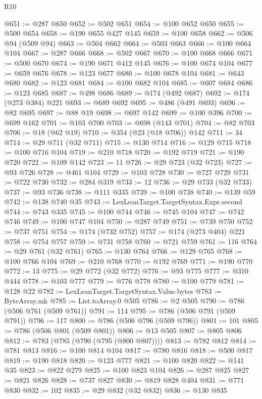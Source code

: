 \begin{lexlean}{R10}
\begin{coremodule}
@651 := @287 @650
@652 := @502 @651
@654 := @100 @652 @650
@655 := @500 @654
@658 := @190 @655 @427 @145
@659 := @100 @658
@662 := @506 @94 (@509 @94)
@663 := @504 @662
@664 := @503 @663
@666 := @100 @664 @104
@667 := @287 @666
@668 := @502 @667
@670 := @100 @668 @666
@671 := @500 @670
@674 := @190 @671 @412 @145
@676 := @100 @674 @104
@677 := @659 @676
@678 := @123 @677
@680 := @100 @678 @104
@681 := @643 @680
@682 := @123 @681
@684 := @100 @682 @104
@685 := @607 @684
@686 := @123 @685
@687 := @498 @686
@689 := @174 (@492 @687)
@692 := @174 (@273 @384) @221
@693 := @689 @692
@695 := @486 (@491 @693)
@696 := @82 @695
@697 := @88 @19
@698 := @697 @142
@699 := @100 @396
@700 := @699 @162
@701 := @103 @700
@703 := @698 (@143 @701)
@704 := @82 @703
@706 := @18 (@62 @19)
@710 := @354 (@23 (@18 @706)) @142
@711 := 34
@714 := @29 @711 (@32 @711)
@715 := @130 @714
@716 := @129 @715
@718 := @100 @716 @104
@719 := @210 @718
@720 := @192 @719
@721 := @190 @720
@722 := @109 @142
@723 := 11
@726 := @29 @723 (@32 @723)
@727 := @93 @726
@728 := @461 @104
@729 := @103 @728
@730 := @727 @729
@731 := @722 @730
@732 := @284 @319
@733 := 12
@736 := @29 @733 (@32 @733)
@737 := @93 @736
@738 := @111 @335
@739 := @100 @738
@740 := @139 @59
@742 := @138 @740 @35
@743 := LexLeanTarget.TargetSyntax.Expr.second
@744 := @743 @335
@745 := @100 @744
@746 := @745 @104
@747 := @742 @746
@749 := @100 @747 @104
@750 := @287 @749
@751 := @739 @750
@752 := @737 @751
@754 := @174 (@732 @752)
@757 := @174 (@273 @404) @221
@758 := @754 @757
@759 := @731 @758
@760 := @721 @759
@761 := 116
@764 := @29 @761 (@32 @761)
@765 := @130 @764
@766 := @129 @765
@768 := @100 @766 @104
@769 := @210 @768
@770 := @192 @769
@771 := @190 @770
@772 := 13
@775 := @29 @772 (@32 @772)
@776 := @93 @775
@777 := @310 @444
@778 := @103 @777
@779 := @776 @778
@780 := @100 @779
@781 := @128 @22
@782 := LexLeanTarget.TargetSyntax.Value.bytes
@783 := ByteArray.mk
@785 := List.toArray.{0} @505
@786 := @2 @505
@790 := @786 (@506 @761 (@509 @761))
@791 := 114
@795 := @786 (@506 @791 (@509 @791))
@796 := 117
@800 := @786 (@506 @796 (@509 @796))
@801 := 101
@805 := @786 (@506 @801 (@509 @801))
@806 := @13 @505
@807 := @805 @806
@812 := @783 (@785 (@790 (@795 (@800 @807))))
@813 := @782 @812
@814 := @781 @813
@816 := @100 @814 @104
@817 := @780 @816
@818 := @500 @817
@819 := @190 @818
@820 := @123 @777
@821 := @100 @820
@822 := @141 @35
@823 := @822 @279
@825 := @100 @823 @104
@826 := @287 @825
@827 := @821 @826
@828 := @737 @827
@830 := @819 @828 @404
@831 := @771 @830
@832 := 102
@835 := @29 @832 (@32 @832)
@836 := @130 @835

\end{coremodule}
\end{lexlean}
